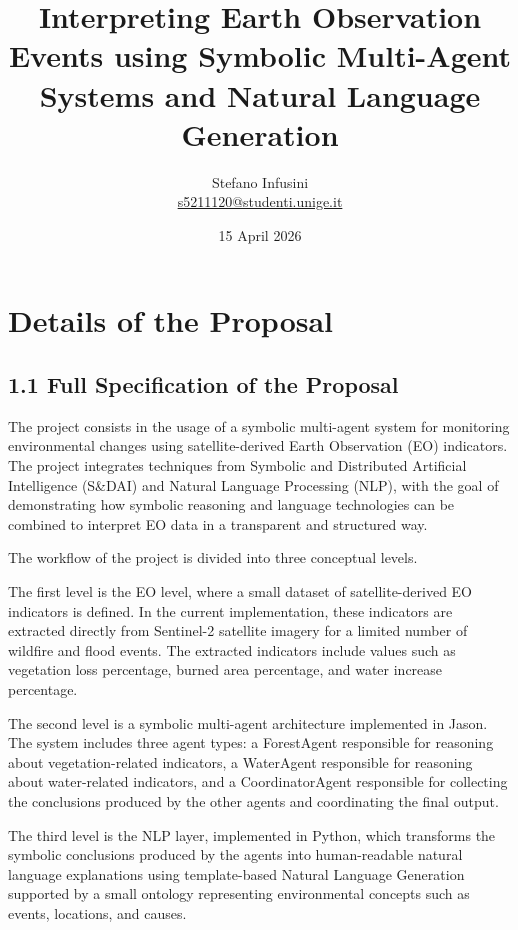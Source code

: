 \documentclass[11pt,a4paper]{article}
\title{\textbf{Interpreting Earth Observation Events using Symbolic Multi-Agent Systems and Natural Language Generation}}
\author{Stefano Infusini \\ \href{mailto:s5211120@studenti.unige.it}{s5211120@studenti.unige.it}}
\date{15 April 2026}
\begin{document}
\maketitle

\vspace{1cm}

\section*{Details of the Proposal}

\subsection*{1.1 Full Specification of the Proposal}

The project consists in the usage of a symbolic multi-agent system for monitoring environmental changes using satellite-derived Earth Observation (EO) indicators. The project integrates techniques from Symbolic and Distributed Artificial Intelligence (S\&DAI) and Natural Language Processing (NLP), with the goal of demonstrating how symbolic reasoning and language technologies can be combined to interpret EO data in a transparent and structured way.

The workflow of the project is divided into three conceptual levels.

The first level is the EO level, where a small dataset of satellite-derived EO indicators is defined. In the current implementation, these indicators are extracted directly from Sentinel-2 satellite imagery for a limited number of wildfire and flood events. The extracted indicators include values such as vegetation loss percentage, burned area percentage, and water increase percentage.

The second level is a symbolic multi-agent architecture implemented in Jason. The system includes three agent types: a ForestAgent responsible for reasoning about vegetation-related indicators, a WaterAgent responsible for reasoning about water-related indicators, and a CoordinatorAgent responsible for collecting the conclusions produced by the other agents and coordinating the final output.

The third level is the NLP layer, implemented in Python, which transforms the symbolic conclusions produced by the agents into human-readable natural language explanations using template-based Natural Language Generation supported by a small ontology representing environmental concepts such as events, locations, and causes.
\end{document}

